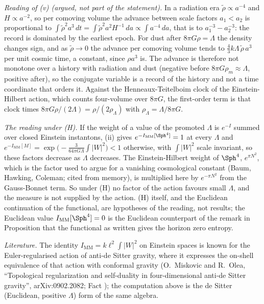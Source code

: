 \emph{Reading of (v) (argued, not part of the statement).} In a radiation era $\tilde\rho \propto a^{-4}$ and $H \propto a^{-2}$, so per comoving volume the advance between scale factors $a_{1} < a_{2}$ is proportional to $\int \tilde\rho^{2} a^{3}\,dt = \int \tilde\rho^{2}a^{2}H^{-1}\,da \propto \int a^{-4}\,da$, that is to $a_{1}^{-3} - a_{2}^{-3}$: the record is dominated by the earliest epoch. For dust after $8\pi G\rho = \Lambda$ the density changes sign, and as $\tilde\rho \to 0$ the advance per comoving volume tends to $\tfrac43 k\Lambda\,\tilde\rho\, a^{3}$ per unit cosmic time, a constant, since $\rho a^{3}$ is. The advance is therefore not monotone over a history with radiation and dust (negative before $8\pi G\rho_{m} \approx \Lambda$, positive after), so the conjugate variable is a record of the history and not a time coordinate that orders it. Against the Henneaux-Teitelboim clock of the Einstein-Hilbert action, which counts four-volume over $8\pi G$, the first-order term is that clock times $8\pi G\rho/(2\Lambda) = \rho/(2\rho_{\Lambda})$ with $\rho_{\Lambda} = \Lambda/8\pi G$.

\emph{The reading under (H).} If the weight of a value of the promoted $\Lambda$ is $e^{-I}$ summed over closed Einstein instantons, (ii) gives $e^{-I_{\mathrm{MM}}[\Sph^{4}]} = 1$ at every $\Lambda$ and $e^{-I_{\mathrm{MM}}[M]} = \exp\bigl(-\tfrac{3}{64\pi G\Lambda}\int|W|^{2}\bigr) < 1$ otherwise, with $\int|W|^{2}$ scale invariant, so these factors decrease as $\Lambda$ decreases. The Einstein-Hilbert weight of $\Sph^{4}$, $e^{\pi N^{2}}$, which is the factor used to argue for a vanishing cosmological constant (Baum, Hawking, Coleman; cited from memory), is multiplied here by $e^{-\pi N^{2}}$ from the Gauss-Bonnet term. So under (H) no factor of the action favours small $\Lambda$, and the measure is not supplied by the action. (H) itself, and the Euclidean continuation of the functional, are hypotheses of the reading, not results; the Euclidean value $I_{\mathrm{MM}}[\Sph^{4}] = 0$ is the Euclidean counterpart of the remark in Proposition  that the functional as written gives the horizon zero entropy.


\emph{Literature.} The identity $I_{\mathrm{MM}} = k\ell^{2}\int|W|^{2}$ on Einstein spaces is known for the Euler-regularised action of anti-de Sitter gravity, where it expresses the on-shell equivalence of that action with conformal gravity (O.~Miskovic and R.~Olea, ``Topological regularization and self-duality in four-dimensional anti-de Sitter gravity'', arXiv:0902.2082; Fact ); the computation above is the de Sitter (Euclidean, positive $\Lambda$) form of the same algebra.
